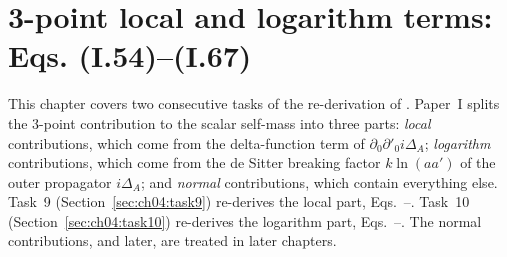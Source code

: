\providecommand{\chIVloc}{\mathrm{loc}}
\providecommand{\chIVlog}{\mathrm{log}}
\providecommand{\chIVok}{\ensuremath{\checkmark}}
\providecommand{\chIVno}{\ensuremath{\times}}

\chapter{3-point local and logarithm terms: Eqs. (I.54)--(I.67)}
\label{ch:ch04}

This chapter covers two consecutive tasks of the re-derivation of \PI.
Paper~I splits the 3-point contribution to the scalar self-mass into three parts:
\emph{local} contributions, which come from the delta-function term of $\partial_0\partial'_0 i\Delta_A$;
\emph{logarithm} contributions, which come from the de Sitter breaking factor $k\ln(aa')$ of the outer propagator $i\Delta_A$;
and \emph{normal} contributions, which contain everything else.
Task~9 (Section~\ref{sec:ch04:task9}) re-derives the local part, Eqs.~--.
Task~10 (Section~\ref{sec:ch04:task10}) re-derives the logarithm part, Eqs.~--.
The normal contributions,  and later, are treated in later chapters.

